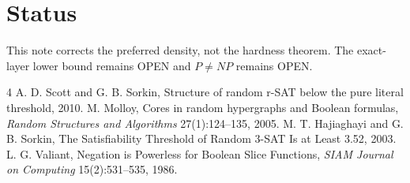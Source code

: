 \documentclass[11pt]{article}
\begin{document}
\section{Status}

This note corrects the preferred density, not the hardness theorem. The exact-layer lower bound remains OPEN and \(P\ne NP\) remains OPEN.

\begin{thebibliography}{4}
A. D. Scott and G. B. Sorkin, Structure of random r-SAT below the pure literal threshold, 2010.
M. Molloy, Cores in random hypergraphs and Boolean formulas, \emph{Random Structures and Algorithms} 27(1):124--135, 2005.
M. T. Hajiaghayi and G. B. Sorkin, The Satisfiability Threshold of Random 3-SAT Is at Least 3.52, 2003.
L. G. Valiant, Negation is Powerless for Boolean Slice Functions, \emph{SIAM Journal on Computing} 15(2):531--535, 1986.
\end{thebibliography}
\end{document}
